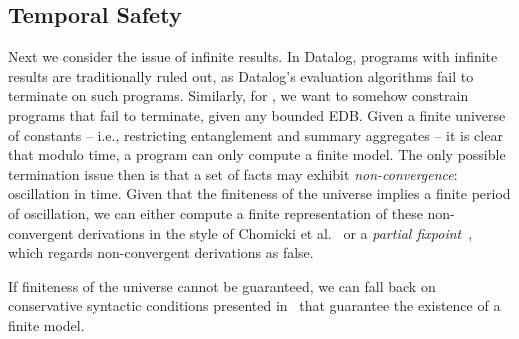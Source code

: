 
%
%
%

\subsection{Temporal Safety}

Next we consider the issue of infinite results.  In Datalog, programs with
infinite results are traditionally ruled out, as Datalog's evaluation
algorithms fail to terminate on such programs.  Similarly, for \lang, we want
to somehow constrain programs that fail to terminate, given any bounded EDB.
Given a finite universe of constants -- i.e., restricting entanglement and
summary aggregates -- it is clear that modulo time, a \lang program can
only compute a finite model.  The only possible termination issue then is that
a set of facts may exhibit {\em non-convergence}: oscillation in time.  Given
that the finiteness of the universe implies a finite period of oscillation, we
can either compute a finite representation of these non-convergent derivations
in the style of Chomicki et al.~\cite{chomicki-infinite} or a {\em partial
fixpoint}~\cite{abiteboul-vianu}, which regards non-convergent derivations as
false.

If finiteness of the universe cannot be guaranteed, we can fall back on
conservative syntactic conditions presented in~\cite{dedalus-techr} that
guarantee the existence of a finite model.


